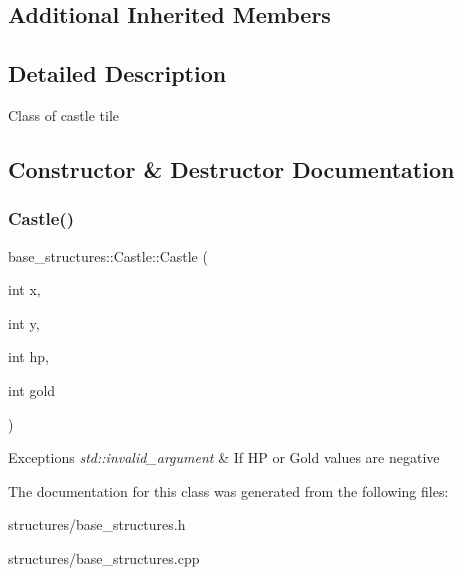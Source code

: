 \subsection*{Additional Inherited Members}


\subsection{Detailed Description}
Class of castle tile 

\subsection{Constructor \& Destructor Documentation}
\mbox{\label{classbase__structures_1_1Castle_a88617f122b64d0f6353e6b776c538af3}} 
\subsubsection{\texorpdfstring{Castle()}{Castle()}}
{\footnotesize\ttfamily base\+\_\+structures\+::\+Castle\+::\+Castle (\begin{DoxyParamCaption}\item[{int}]{x,  }\item[{int}]{y,  }\item[{int}]{hp,  }\item[{int}]{gold }\end{DoxyParamCaption})}


\begin{DoxyExceptions}{Exceptions}
{\em std\+::invalid\+\_\+argument} & If HP or Gold values are negative \\
\hline
\end{DoxyExceptions}


The documentation for this class was generated from the following files\+:\begin{DoxyCompactItemize}
\item 
structures/base\+\_\+structures.\+h\item 
structures/base\+\_\+structures.\+cpp\end{DoxyCompactItemize}
